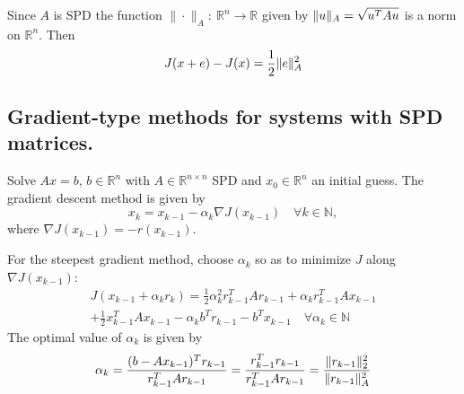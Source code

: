\documentclass[12pt]{article}
\newcounter{lecture}
\theoremstyle{definition}
\theoremstyle{remark}
\numberwithin{equation}{section}
\newcommand{\R}{\mathbb{R}}
\newcommand{\N}{\mathbb{N}}
\newcommand{\normempty}{\|\cdot\|}
\DeclarePairedDelimiter{\norm}{\lVert}{\rVert}
\begin{document}
Since $A$ is SPD the function $\normempty_A:\ \R^n \rightarrow \R$ given by $\norm{u}_A = \sqrt{u^TAu}$ is a norm on $\R^n$. Then
\begin{equation*}
  J(x+e) - J(x) = \frac{1}{2} \norm{e}_A^2
\end{equation*}

\subsection*{Gradient-type methods for systems with SPD matrices.}

Solve $Ax = b$, $b \in \R^n$ with $A \in \R^{n\times n}$ SPD and $x_0 \in \R^n$ an initial guess. The gradient descent method is given by
\begin{equation*}
  x_k = x_{k-1} - \alpha_k \nabla J(x_{k-1}) \quad \forall k \in \N,
\end{equation*}
where $\nabla J(x_{k-1}) = -r(x_{k-1})$.

For the steepest gradient method, choose $\alpha_k$ so as to minimize $J$ along $\nabla J(x_{k-1})$:
\begin{multline*}
  J(x_{k-1} + \alpha_k r_k) = \frac{1}{2} \alpha_k^2 r_{k-1}^T A r_{k-1} + \alpha_k r_{k-1}^T A x_{k-1} \\+ \frac{1}{2} x_{k-1}^T A x_{k-1} -\alpha_k b^T r_{k-1} - b^T x_{k-1} \quad \forall \alpha_k \in \N
\end{multline*}
The optimal value of $\alpha_k$ is given by
\begin{equation*}
  \alpha_k = \frac{(b-Ax_{k-1})^T r_{k-1}}{r_{k-1}^T A r_{k-1}} = \frac{r_{k-1}^T r_{k-1}}{r_{k-1}^T A r_{k-1}} = \frac{\norm{r_{k-1}}_2^2}{\norm{r_{k-1}}_A^2}
\end{equation*}

\end{document}
